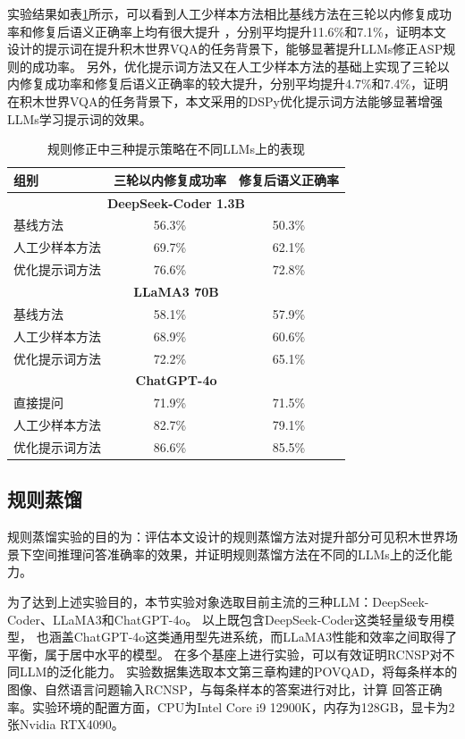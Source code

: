 实验结果如表\ref{tab:rule-fix-result}所示，可以看到人工少样本方法相比基线方法在三轮以内修复成功率和修复后语义正确率上均有很大提升
，分别平均提升11.6\%和7.1\%，证明本文设计的提示词在提升积木世界VQA的任务背景下，能够显著提升LLMs修正ASP规则的成功率。
另外，优化提示词方法又在人工少样本方法的基础上实现了三轮以内修复成功率和修复后语义正确率的较大提升，分别平均提升4.7\%和7.4\%，证明
在积木世界VQA的任务背景下，本文采用的DSPy优化提示词方法能够显著增强LLMs学习提示词的效果。
\begin{table}[h]
    \centering
    \begin{tabular}{lcc}
        \toprule
        \textbf{组别} & \textbf{三轮以内修复成功率} & \textbf{修复后语义正确率}\\
        \midrule
        \multicolumn{3}{c}{\textbf{DeepSeek-Coder 1.3B}} \\
        基线方法 & 56.3\% & 50.3\%\\
        人工少样本方法 & 69.7\% & 62.1\% \\
        优化提示词方法 & 76.6\% & 72.8\% \\
        \midrule
        \multicolumn{3}{c}{\textbf{LLaMA3 70B}} \\
        基线方法 & 58.1\% & 57.9\% \\
        人工少样本方法 & 68.9\% & 60.6\% \\
        优化提示词方法 & 72.2\% & 65.1\% \\
        \midrule
        \multicolumn{3}{c}{\textbf{ChatGPT-4o}} \\
        直接提问 & 71.9\% & 71.5\% \\
        人工少样本方法 & 82.7\% & 79.1\% \\
        优化提示词方法 & 86.6\% & 85.5\% \\
        \bottomrule
    \end{tabular}
    \caption{规则修正中三种提示策略在不同LLMs上的表现}
    \label{tab:rule-fix-result}
\end{table}

\subsection{规则蒸馏}
规则蒸馏实验的目的为：评估本文设计的规则蒸馏方法对提升部分可见积木世界场景下空间推理问答准确率的效果，并证明规则蒸馏方法在不同的LLMs上的泛化能力。

为了达到上述实验目的，本节实验对象选取目前主流的三种LLM：DeepSeek-Coder、LLa\-MA3和ChatGPT-4o。
以上既包含DeepSeek-Coder这类轻量级专用模型，
也涵盖ChatGPT-4o这类通用型先进系统，而LLaMA3性能和效率之间取得了平衡，属于居中水平的模型。
在多个基座上进行实验，可以有效证明RCNSP对不同LLM的泛化能力。
实验数据集选取本文第三章构建的POVQAD，将每条样本的图像、自然语言问题输入RCNSP，与每条样本的答案进行对比，计算
回答正确率。实验环境的配置方面，CPU为Intel Core i9 12900K，内存为128GB，显卡为2张Nvidia RTX4090。

